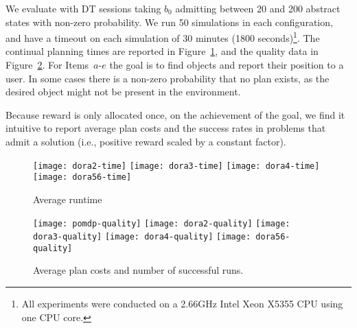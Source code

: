 We evaluate with DT sessions taking $b_0$ admitting between 20 and 200
abstract states with non-zero probability. We run 50 simulations in
each configuration, and have a timeout on each simulation of 30
minutes (1800 seconds)\footnote{All experiments were conducted on a
 2.66GHz Intel Xeon X5355 CPU using one CPU core.}. The continual planning
times are reported in Figure~\ref{fig:results-time}, and the quality
data in Figure~\ref{fig:results-quality}.
For Items~$a$-$e$ the goal is to find objects and report their
position to a user. In some cases there is a non-zero probability that
no plan exists, as the desired object might not be present in the
environment. 

Because reward is only allocated
once, on the achievement of the goal,  we find it
intuitive to report average plan costs and the success rates in
problems that admit a solution (i.e., positive reward scaled by a
constant factor).

\begin{figure}[h!]
  \texttt{[image: dora2-time]}\hfill
  \texttt{[image: dora3-time]}\hfill
  \texttt{[image: dora4-time]}\hfill
  \vspace{2mm}
  \texttt{[image: dora56-time]}\hfill
  \caption{Average runtime}
  \label{fig:results-time}
\end{figure}

\begin{figure}[h!]
  \texttt{[image: pomdp-quality]}\hfill
  \texttt{[image: dora2-quality]}\hfill
  \texttt{[image: dora3-quality]}\hfill
  \texttt{[image: dora4-quality]}\hfill
  \vspace{2mm}
  \texttt{[image: dora56-quality]}\hfill
  \caption{Average plan costs and number of successful runs.}
  \label{fig:results-quality}
\end{figure}

